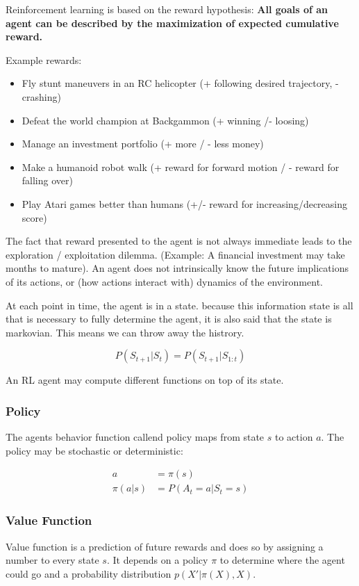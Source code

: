 \documentclass[main]{subfiles}
\begin{document}
Reinforcement learning is based on the reward hypothesis:
\textbf{All goals of an agent can be described by the maximization of expected cumulative reward.}

Example rewards:

\begin{itemize}
    \item Fly stunt maneuvers in an RC helicopter (+ following desired trajectory, - crashing)
    \item Defeat the world champion at Backgammon (+ winning /- loosing)
    \item Manage an investment portfolio (+ more / -  less money)
    \item Make a humanoid robot walk (+ reward for forward motion / - reward for falling over)
    \item Play Atari games better than humans (+/- reward for increasing/decreasing score)
\end{itemize}

The fact that reward presented to the agent is not always immediate leads to the exploration / exploitation dilemma. (Example: A financial investment may take months to mature). 
An agent does not intrinsically know the future implications of its actions, or (how actions interact with) dynamics of the environment.

At each point in time, the agent is in a state. because this information state is all that is necessary to fully determine the agent, it is also said that the state is markovian. This means we can throw away the histrory.

\begin{equation}
    P(S_{t+1}|S_t) = P(S_{t+1} | S_{1:t})
\end{equation}

An RL agent may compute different functions on top of its state.

\subsubsection{Policy}
The agents behavior function callend policy maps from state $s$ to action $a$. The policy may be stochastic or deterministic:

\begin{align}
    a & = \pi(s) \\
    \pi(a|s) & = P(A_t = a | S_t = s)
\end{align}

\subsubsection{Value Function}
Value function is a prediction of future rewards and does so by assigning a number to every state $s$. It depends on a policy $\pi$ to determine where the agent could go and a probability distribution $p(X'|\pi(X), X)$.
\end{document}
